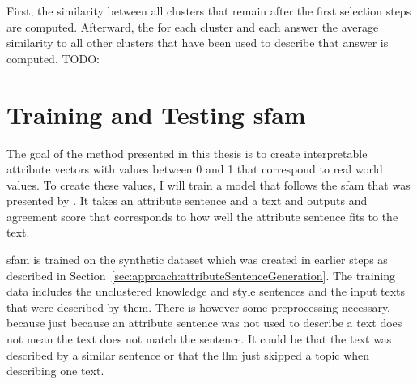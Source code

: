First, the similarity between all clusters that remain after the first selection steps are computed. Afterward, the for each cluster and each answer the average similarity to all other clusters that have been used to describe that answer is computed. TODO:




\section{Training and Testing \acs{sfam}}
\label{sec:approach:sfam}

The goal of the method presented in this thesis is to create interpretable attribute vectors with values between \num{0} and \num{1} that correspond to real world values. To create these values, I will train a model that follows the \acf{sfam} that was presented by \citet{patelLearningInterpretableStyle2023}. It takes an attribute sentence and a text and outputs and agreement score that corresponds to how well the attribute sentence fits to the text.

\ac{sfam} is trained on the synthetic dataset which was created in earlier steps as described in Section~\ref{sec:approach:attributeSentenceGeneration}. The training data includes the unclustered knowledge and style sentences and the input texts that were described by them. There is however some preprocessing necessary, because just because an attribute sentence was not used to describe a text does not mean the text does not match the sentence. It could be that the text was described by a similar sentence or that the \ac{llm} just skipped a topic when describing one text.


